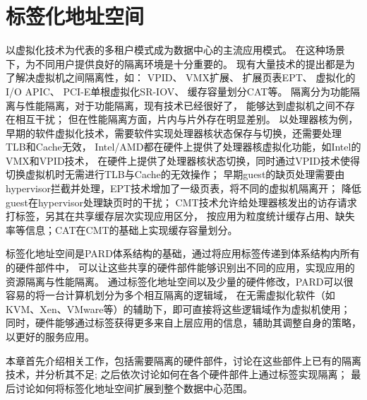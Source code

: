 

\chapter{标签化地址空间}
\label{chap:labeladdrspace}

以虚拟化技术为代表的多租户模式成为数据中心的主流应用模式。
在这种场景下，为不同用户提供良好的隔离环境是十分重要的。
现有大量技术的提出都是为了解决虚拟机之间隔离性，如：
VPID、
VMX扩展、
扩展页表EPT、
虚拟化的I/O APIC、
PCI-E单根虚拟化SR-IOV、
缓存容量划分CAT等。
隔离分为功能隔离与性能隔离，对于功能隔离，现有技术已经很好了，
能够达到虚拟机之间不存在相互干扰；
但在性能隔离方面，片内与片外存在明显差别。
以处理器核为例，
早期的软件虚拟化技术，需要软件实现处理器核状态保存与切换，还需要处理TLB和Cache无效，
Intel/AMD都在硬件上提供了处理器核虚拟化功能，如Intel的VMX和VPID技术，
在硬件上提供了处理器核状态切换，同时通过VPID技术使得切换虚拟机时无需进行TLB与Cache的无效操作；
早期guest的缺页处理需要由hypervisor拦截并处理，EPT技术增加了一级页表，将不同的虚拟机隔离开；
降低guest在hypervisor处理缺页时的干扰；
CMT技术允许给处理器核发出的访存请求打标签，另其在共享缓存层次实现应用区分，
按应用为粒度统计缓存占用、缺失率等信息；CAT在CMT的基础上实现缓存容量划分。

%
%
%
%
%

标签化地址空间是PARD体系结构的基础，通过将应用标签传递到体系结构内所有的硬件部件中，
可以让这些共享的硬件部件能够识别出不同的应用，实现应用的资源隔离与性能隔离。
通过标签化地址空间以及少量的硬件修改，PARD可以很容易的将一台计算机划分为多个相互隔离的逻辑域，
在无需虚拟化软件（如KVM、Xen、VMware等）的辅助下，即可直接将这些逻辑域作为虚拟机使用；
同时，硬件能够通过标签获得更多来自上层应用的信息，辅助其调整自身的策略，以更好的服务应用。


本章首先介绍相关工作，包括需要隔离的硬件部件，讨论在这些部件上已有的隔离技术，并分析其不足;
之后依次讨论如何在各个硬件部件上通过标签实现隔离；
最后讨论如何将标签化地址空间扩展到整个数据中心范围。


